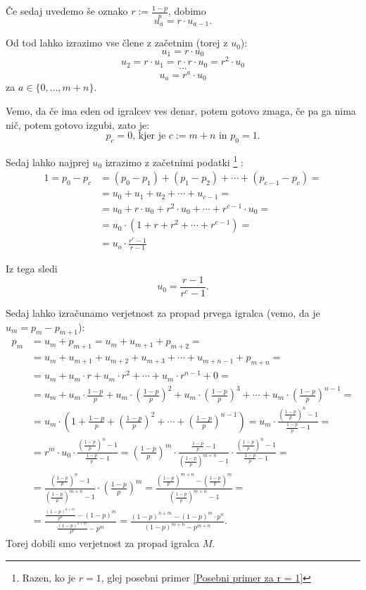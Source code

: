 \documentclass[12pt, a4paper]{article}
\begin{document}
Če sedaj uvedemo še oznako $r:=\frac{1-p}{p}$, dobimo
$$u_a = r \cdot u_{a-1}.$$


Od tod lahko izrazimo vse člene z začetnim (torej z $u_0$):
$$u_1 = r \cdot u_0$$
$$u_2 = r \cdot u_1 = r \cdot r \cdot u_0 = r^2 \cdot u_0$$ 
$$\cdots $$
$$u_a = r^a \cdot u_0$$ za $ a \in \{ 0, \dotso , m + n\}.$

Vemo, da če ima eden od igralcev ves denar, potem gotovo zmaga, če pa ga nima nič, potem gotovo izgubi, zato je:
$$p_c = 0 \textrm{, kjer je } c := m + n \textrm{ in } p_0 = 1.$$

Sedaj lahko najprej $u_0$ izrazimo z začetnimi podatki \footnote{Razen, ko je $r = 1$, glej posebni primer \ref{Posebni primer za r = 1}} :
\begin{equation*}
\begin{split}
1 = p_0 - p_c &= (p_0 - p_1) + (p_1 - p_2) + \cdots + (p_{c-1} - p_c) = \\
        &= u_0 + u_1 + u_2 + \cdots + u_{c-1} = \\
        &= u_0 + r \cdot u_0 + r^2 \cdot u_0 + \cdots + r^{c-1} \cdot u_0 = \\
        &= u_0 \cdot (1 + r + r^2 + \cdots + r^{c-1}) = \\
        &= u_o \cdot \frac{r^c - 1}{r-1}  
\end{split}
\end{equation*}  

Iz tega sledi $$u_0 = \frac{r-1}{r^c -1}.$$


Sedaj lahko izračunamo verjetnost za propad prvega igralca (vemo, da je $u_m = p_m - p_{m+1}$):
\begin{equation*}
\begin{split}
p_m &= u_m + p_{m+1} = u_m + u_{m+1} + p_{m+2} = \\
    &= u_m + u_{m+1} + u_{m+2} + u_{m+3} + \cdots + u_{m+n-1} + p_{m+n} = \\
    &= u_m + u_m \cdot r + u_m \cdot r^2 + \cdots + u_m \cdot r^{n-1} + 0 = \\
    &= u_m + u_m \cdot \frac{1-p}{p} + u_m \cdot (\frac{1-p}{p})^2 + u_m \cdot (\frac{1-p}{p})^3 + \cdots + u_m \cdot (\frac{1-p}{p})^{n-1} = \\
    &= u_m \cdot (1 + \frac{1-p}{p} + (\frac{1-p}{p})^2 + \cdots + (\frac{1-p}{p})^{n-1}) 
    = u_m \cdot \frac{(\frac{1-p}{p})^n - 1}{\frac{1-p}{p} - 1} = \\
    &= r^m \cdot u_0 \cdot \frac{(\frac{1-p}{p})^n - 1}{\frac{1-p}{p} - 1}  
    = (\frac{1-p}{p})^m \cdot \frac{\frac{1-p}{p} - 1}{(\frac{1-p}{p})^{m+n} -1}\cdot \frac{(\frac{1-p}{p})^n - 1}{\frac{1-p}{p} - 1} = \\
    &= \frac{(\frac{1-p}{p})^n - 1}{(\frac{1-p}{p})^{m+n} -1} \cdot (\frac{1-p}{p})^m 
    = \frac{(\frac{1-p}{p})^{m+n} - (\frac{1-p}{p})^m}{(\frac{1-p}{p})^{m+n} -1} = \\
    &= \frac{\frac{(1-p)^{n+m}}{p^n} - (1-p)^m}{\frac{(1-p)^{n+m}}{p^n} - p^m} = 
    \frac{(1-p)^{n+m} - (1-p)^m \cdot p^n}{(1-p)^{m+n} - p^{m+n}}.
\end{split} 
\end{equation*}
Torej dobili smo verjetnost za propad igralca $M$.
\end{document}
